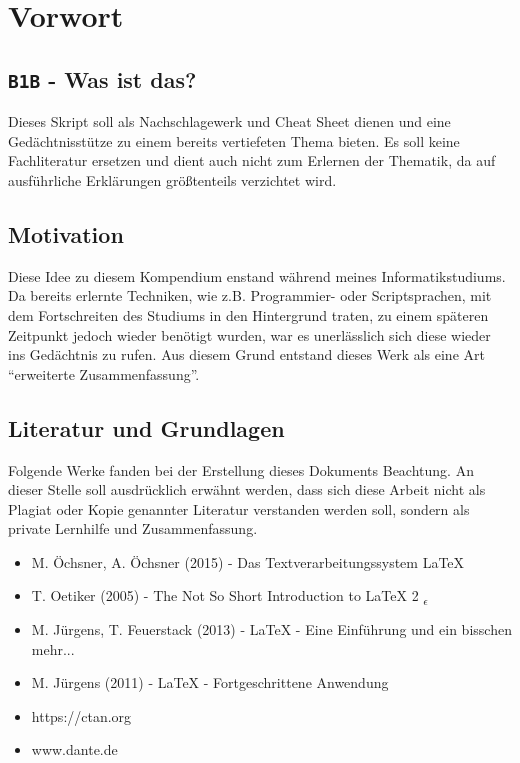 \chapter{Vorwort}
\section{\texttt{B1B} - Was ist das?}
Dieses Skript soll als Nachschlagewerk und Cheat Sheet dienen und eine Gedächtnisstütze zu einem bereits vertiefeten Thema bieten. Es soll keine Fachliteratur ersetzen und dient auch nicht zum Erlernen der Thematik, da auf ausführliche Erklärungen größtenteils verzichtet wird.
\section{Motivation}
Diese Idee zu diesem Kompendium enstand während meines Informatikstudiums. Da bereits erlernte Techniken, wie z.B. Programmier- oder Scriptsprachen, mit dem Fortschreiten des Studiums in den Hintergrund traten, zu einem späteren Zeitpunkt jedoch wieder benötigt wurden, war es unerlässlich sich diese wieder ins Gedächtnis zu rufen. Aus diesem Grund entstand dieses Werk als eine Art ``erweiterte Zusammenfassung''.
\section{Literatur und Grundlagen}
Folgende Werke fanden bei der Erstellung dieses Dokuments Beachtung. An dieser Stelle soll ausdrücklich erwähnt werden, dass sich diese Arbeit nicht als Plagiat oder Kopie genannter Literatur verstanden werden soll, sondern als private Lernhilfe und Zusammenfassung.
\begin{itemize}
\item M. Öchsner, A. Öchsner (2015) - Das Textverarbeitungssystem LaTeX
\item T. Oetiker (2005) - The Not So Short Introduction to \LaTeX{} 2 \textsubscript{$\epsilon$}
\item M. Jürgens, T. Feuerstack (2013) - \LaTeX{} - Eine Einführung und ein bisschen mehr...
\item M. Jürgens (2011) - \LaTeX{} - Fortgeschrittene Anwendung
\item https://ctan.org
\item www.dante.de
\end{itemize}
